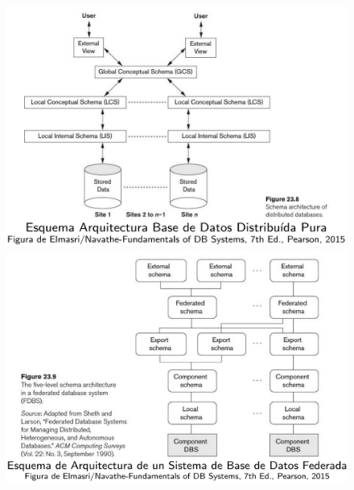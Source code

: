 \begin{figure}[H]
    \centering
    \includegraphics[scale=0.45]{fig/arquitectura-distribuida-pura.png}
    \includegraphics[scale=0.45]{fig/arquitectura-distribuida-federada.png}
\end{figure}




